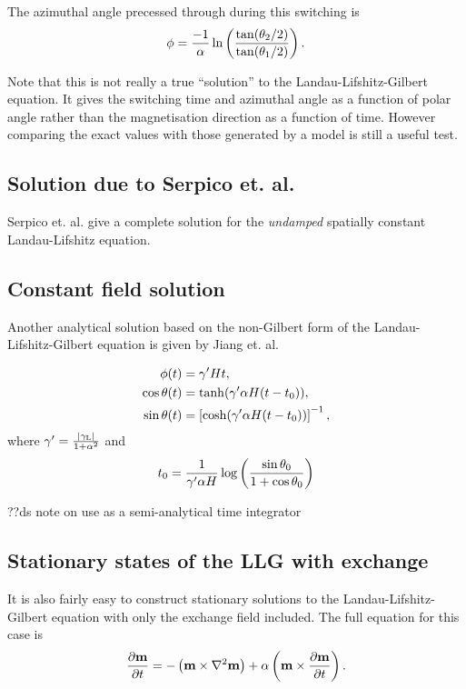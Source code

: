 The azimuthal angle precessed through during this switching is
\begin{equation}
  \phi = \frac{-1}{\alpha} \ln \left( \frac{\tan(\theta_2/2)}{\tan(\theta_1/2)} \right).
\end{equation}

Note that this is not really a true ``solution'' to the Landau-Lifshitz-Gilbert equation.
It gives the switching time and azimuthal angle as a function of polar angle rather than the magnetisation direction as a function of time. However comparing the exact values with those generated by a model is still a useful test.

\subsection{Solution due to Serpico et. al.}

Serpico et. al. \cite{Serpico2003} give a complete solution for the \emph{undamped} spatially constant Landau-Lifshitz equation.




\subsection{Constant field solution}

Another analytical solution based on the non-Gilbert form of the Landau-Lifshitz-Gilbert equation is given by Jiang et. al.\cite{Jiang2001}

\begin{align*}
  \phi(t) &= \gamma' H t, \\
  \cos \theta(t) &= \tanh (\gamma' \alpha H (t - t_0)), \\
  \sin \theta(t) &= \left[ \cosh (\gamma' \alpha H (t - t_0)) \right]^{-1}, \\
\end{align*}
where $\gamma' = \frac{{\lvert \gamma_{\text{\tiny{L}}} \rvert}}{1 + \alpha^2}$ and
\begin{equation}
  t_0 = \frac{1}{\gamma' \alpha H} \log \left( \frac{\sin \theta_0}{1 + \cos \theta_0} \right)
\end{equation}


??ds note on use as a semi-analytical time integrator

\subsection{Stationary states of the LLG with exchange}

It is also fairly easy to construct stationary solutions to the Landau-Lifshitz-Gilbert equation with only the exchange field included.
The full equation for this case is
\begin{equation}
  \frac{\partial \mathbf{m}}{\partial t} = - \left( \mathbf{m} \times \nabla^2 \mathbf{m} \right) + \alpha \left( \mathbf{m} \times \frac{\partial \mathbf{m}}{\partial t} \right).
\end{equation}

